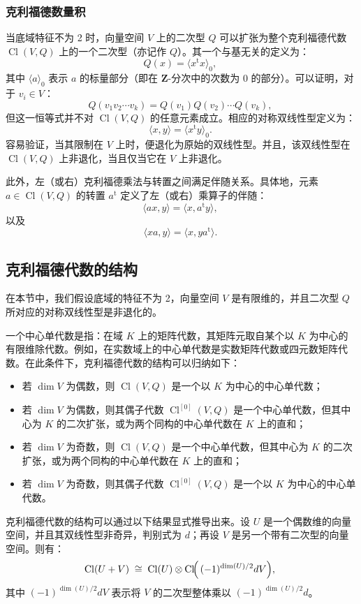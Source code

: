 \subsubsection{克利福德数量积}
当底域特征不为 2 时，向量空间 $V$ 上的二次型 $Q$ 可以扩张为整个克利福德代数 $\operatorname{Cl}(V, Q)$ 上的一个二次型（亦记作 $Q$）。其一个与基无关的定义为：
$$
Q(x) = \langle x^{\mathrm{t}} x \rangle_0,~
$$
其中 $\langle a \rangle_0$ 表示 $a$ 的标量部分（即在 $\mathbf{Z}$-分次中的次数为 0 的部分）。可以证明，对于 $v_i \in V$：
$$
Q(v_1 v_2 \cdots v_k) = Q(v_1) Q(v_2) \cdots Q(v_k),~
$$
但这一恒等式并不对 $\operatorname{Cl}(V, Q)$ 的任意元素成立。相应的对称双线性型定义为：
$$
\langle x, y \rangle = \langle x^{\mathrm{t}} y \rangle_0.~
$$
容易验证，当其限制在 $V$ 上时，便退化为原始的双线性型。并且，该双线性型在 $\operatorname{Cl}(V, Q)$ 上非退化，当且仅当它在 $V$ 上非退化。

此外，左（或右）克利福德乘法与转置之间满足伴随关系。具体地，元素 $a \in \operatorname{Cl}(V, Q)$ 的转置 $a^{\mathrm{t}}$ 定义了左（或右）乘算子的伴随：
$$
\langle a x, y \rangle = \langle x, a^{\mathrm{t}} y \rangle,~
$$
以及
$$
\langle x a, y \rangle = \langle x, y a^{\mathrm{t}} \rangle.~
$$
\subsection{克利福德代数的结构}
在本节中，我们假设底域的特征不为 2，向量空间 $V$ 是有限维的，并且二次型 $Q$ 所对应的对称双线性型是非退化的。

一个中心单代数是指：在域 $K$ 上的矩阵代数，其矩阵元取自某个以 $K$ 为中心的有限维除代数。例如，在实数域上的中心单代数是实数矩阵代数或四元数矩阵代数。在此条件下，克利福德代数的结构可以归纳如下：
\begin{itemize}
\item 若 $\dim V$ 为偶数，则 $\operatorname{Cl}(V, Q)$ 是一个以 $K$ 为中心的中心单代数；
\item 若 $\dim V$ 为偶数，则其偶子代数 $\operatorname{Cl}^{[0]}(V, Q)$ 是一个中心单代数，但其中心为 $K$ 的二次扩张，或为两个同构的中心单代数在 $K$ 上的直和；
\item 若 $\dim V$ 为奇数，则 $\operatorname{Cl}(V, Q)$ 是一个中心单代数，但其中心为 $K$ 的二次扩张，或为两个同构的中心单代数在 $K$ 上的直和；
\item 若 $\dim V$ 为奇数，则其偶子代数 $\operatorname{Cl}^{[0]}(V, Q)$ 是一个以 $K$ 为中心的中心单代数。
\end{itemize}
克利福德代数的结构可以通过以下结果显式推导出来。设 $U$ 是一个偶数维的向量空间，并且其双线性型非奇异，判别式为 $d$；再设 $V$ 是另一个带有二次型的向量空间。则有：
$$
\operatorname{Cl}(U + V) \;\cong\; \operatorname{Cl}(U) \otimes \operatorname{Cl}\!\Bigl(\,(-1)^{\dim(U)/2} d V \Bigr),~
$$
其中 $(-1)^{\dim(U)/2} d V$ 表示将 $V$ 的二次型整体乘以 $(-1)^{\dim(U)/2} d$。

